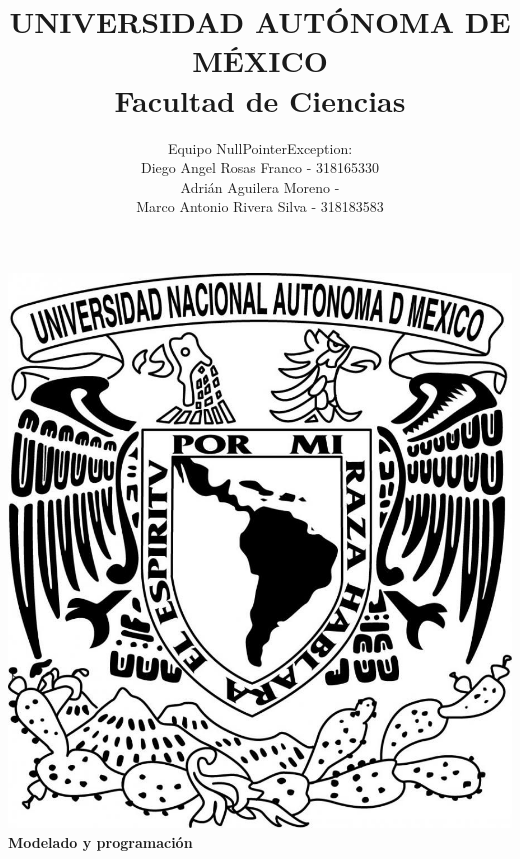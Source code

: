\title{UNIVERSIDAD AUT\'ONOMA DE M\'EXICO\\ Facultad de Ciencias}
\author{Equipo NullPointerException:\\
  Diego Angel Rosas Franco   - 318165330 \\
  Adri\'an Aguilera Moreno   - \\
  Marco Antonio Rivera Silva - 318183583}
\date{}
\maketitle
\begin{center}
  \includegraphics[scale=0.20]{../Portada/Portada}\\[0.4cm]
  \Large
  \bf{Modelado y programación}
  \normalsize
\end{center}
\newpage
{}

